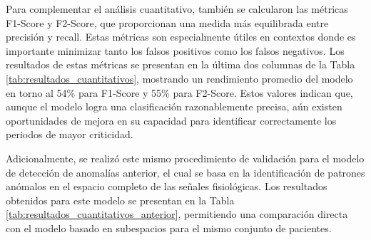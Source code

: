 Para complementar el análisis cuantitativo, también se calcularon las métricas F1-Score y F2-Score, que proporcionan una medida más equilibrada entre precisión y recall. Estas métricas son especialmente útiles en contextos donde es importante minimizar tanto los falsos positivos como los falsos negativos. Los resultados de estas métricas se presentan en la última dos columnas de la Tabla \ref{tab:resultados_cuantitativos}, mostrando un rendimiento promedio del modelo en torno al 54\% para F1-Score y 55\% para F2-Score. Estos valores indican que, aunque el modelo logra una clasificación razonablemente precisa, aún existen oportunidades de mejora en su capacidad para identificar correctamente los periodos de mayor criticidad.

Adicionalmente, se realizó este mismo procedimiento de validación para el modelo de detección de anomalías anterior, el cual se basa en la identificación de patrones anómalos en el espacio completo de las señales fisiológicas. Los resultados obtenidos para este modelo se presentan en la Tabla \ref{tab:resultados_cuantitativos_anterior}, permitiendo una comparación directa con el modelo basado en subespacios para el mismo conjunto de pacientes.

